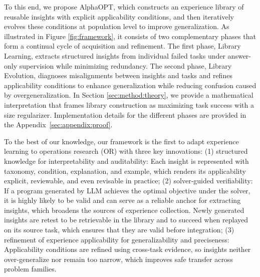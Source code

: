 \documentclass[sigconf, nonacm]{acmart}
\begin{document}
To this end, we propose AlphaOPT, which constructs an experience library of reusable insights with explicit applicability conditions, and then iteratively evolves these conditions at population level to improve generalization. As illustrated in Figure \ref{fig:framework}, it consists of two complementary phases that form a continual cycle of acquisition and refinement. The first phase, Library Learning, extracts structured insights from individual failed tasks under answer-only supervision while minimizing redundancy. The second phase, Library Evolution, diagnoses misalignments between insights and tasks and refines applicability conditions to enhance generalization while reducing confusion caused by overgeneralization. In Section \ref{sec:method:theory}, we provide a mathematical interpretation that frames library construction as maximizing task success with a size regularizer. Implementation details for the different phases are provided in the Appendix~\ref{sec:appendix:proof}. 

To the best of our knowledge, our framework is the first to adapt experience learning to operations research (OR) with three key innovations: (1) structured knowledge for interpretability and auditability: Each insight is represented with taxonomy, condition, explanation, and example, which renders its applicability explicit, reviewable, and even revisable in practice; (2) solver-guided verifiability: If a program generated by LLM achieves the optimal objective under the solver, it is highly likely to be valid and can serve as a reliable anchor for extracting insights, which broadens the sources of experience collection. Newly generated insights are retest to be retrievable in the library and to succeed when replayed on its source task, which ensures that they are valid before integration; (3) refinement of experience applicability for generalizability and preciseness: Applicability conditions are refined using cross-task evidence, so insights neither over-generalize nor remain too narrow, which improves safe transfer across problem families.
\end{document}
